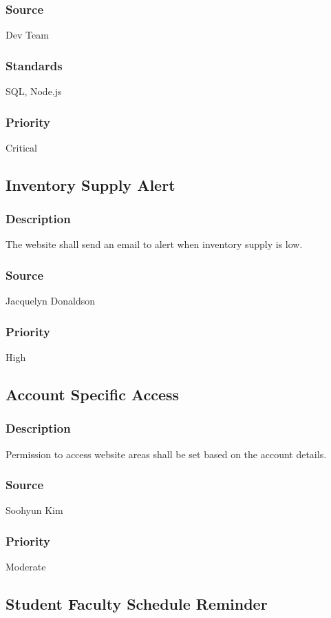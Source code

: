 \subsubsection{Source}
Dev Team
\subsubsection{Standards}
SQL, Node.js
\subsubsection{Priority}
Critical

\subsection{Inventory Supply Alert}
\subsubsection{Description}
The website shall send an email to alert when inventory supply is low.
\subsubsection{Source}
Jacquelyn Donaldson
\subsubsection{Priority}
High

\subsection{Account Specific Access}
\subsubsection{Description}
Permission to access website areas shall be set based on the account details.
\subsubsection{Source}
Soohyun Kim
\subsubsection{Priority}
Moderate

\subsection{Student Faculty Schedule Reminder}
